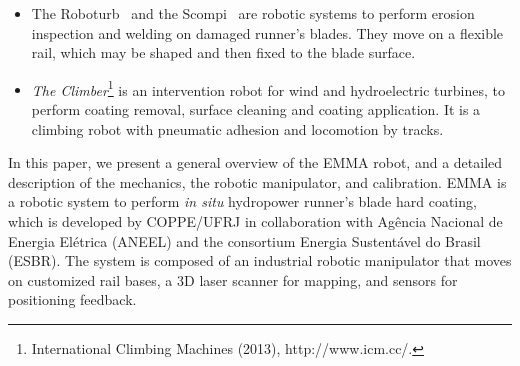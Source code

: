 \begin{itemize}
\item The Roboturb~\cite{roboturb} and the Scompi~\cite{scompi} are robotic
systems to perform erosion inspection and welding on damaged runner's blades.
They move on a flexible rail, which may be shaped and then fixed to the blade
surface.

\item \textit{The Climber}\footnote{International Climbing Machines (2013),
http://www.icm.cc/.} %
 is an intervention robot for wind and hydroelectric turbines, to perform
coating removal, surface cleaning and coating application. It is a climbing robot with pneumatic adhesion and locomotion by tracks.
\end{itemize}

In this paper, we present a general overview of the EMMA robot, and a detailed
description of the mechanics, the robotic manipulator, and calibration. EMMA is
a robotic system to perform \textit{in situ} hydropower runner's blade hard
coating, which is developed by COPPE/UFRJ in collaboration with Agência Nacional
de Energia Elétrica (ANEEL) and the consortium Energia Sustentável do Brasil
(ESBR). The system is composed of an industrial robotic manipulator that moves
on customized rail bases, a 3D laser scanner for mapping, and sensors for positioning
feedback. 
\begin{comment}
The system operate in a confined space, move
on a sloping and slippery environment through a rail, identify the runner's
blades, calibrate its position, generate the path planning and perform the hard
coating. 


This text is organized as follows: a general overview of the robot and its main
challenges are presented in Section \ref{sec:general_overview}, detailed
descriptions of the embedded electronics, the vehicle support system, power
supply system, and software architecture are taken in
Sections \ref{sec:electronics_overview}, \ref{sec:powersupply_overview}, and
\ref{sec:software} respectively.
In Section \ref{sec:results}, preliminary results are shown, and concluding
remarks are drawn in Section \ref{sec:conclusions}.
\end{comment}